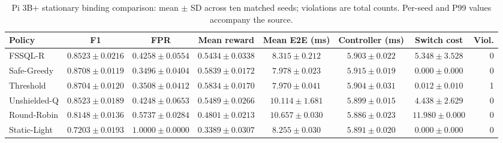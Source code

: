 \begin{table}[t]
\caption{Pi 3B+ stationary binding comparison: mean $\pm$ SD across ten matched seeds; violations are total counts. Per-seed and P99 values accompany the source.}
\centering\scriptsize
\setlength{\tabcolsep}{3pt}
\begin{tabular}{lccccccr}
\toprule
Policy & F1 & FPR & Mean reward & Mean E2E (ms) & Controller (ms) & Switch cost & Viol. \\
\midrule
FSSQL-R & $0.8523\pm0.0216$ & $0.4258\pm0.0554$ & $0.5434\pm0.0338$ & $8.315\pm0.212$ & $5.903\pm0.022$ & $5.348\pm3.528$ & 0 \\
Safe-Greedy & $0.8708\pm0.0119$ & $0.3496\pm0.0404$ & $0.5839\pm0.0172$ & $7.978\pm0.023$ & $5.915\pm0.019$ & $0.000\pm0.000$ & 0 \\
Threshold & $0.8704\pm0.0120$ & $0.3508\pm0.0412$ & $0.5834\pm0.0170$ & $7.970\pm0.041$ & $5.904\pm0.031$ & $0.012\pm0.010$ & 1 \\
Unshielded-Q & $0.8523\pm0.0189$ & $0.4248\pm0.0653$ & $0.5489\pm0.0266$ & $10.114\pm1.681$ & $5.899\pm0.015$ & $4.438\pm2.629$ & 0 \\
Round-Robin & $0.8148\pm0.0136$ & $0.5737\pm0.0284$ & $0.4801\pm0.0213$ & $10.657\pm0.030$ & $5.886\pm0.023$ & $11.980\pm0.000$ & 0 \\
Static-Light & $0.7203\pm0.0193$ & $1.0000\pm0.0000$ & $0.3389\pm0.0307$ & $8.255\pm0.030$ & $5.891\pm0.020$ & $0.000\pm0.000$ & 0 \\
\bottomrule
\end{tabular}
\end{table}
